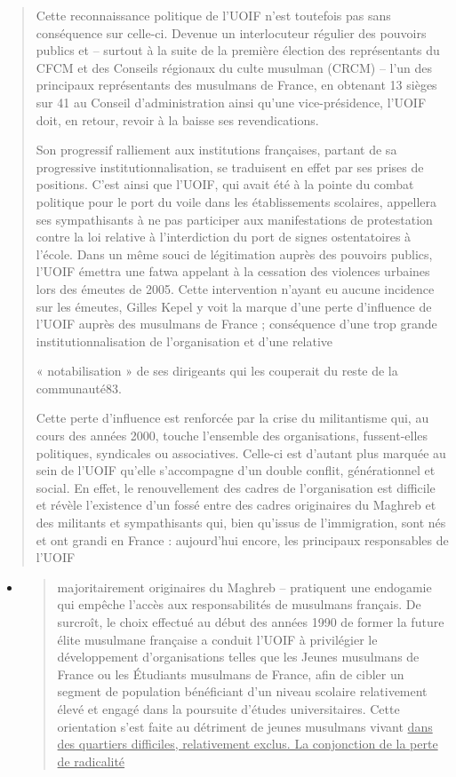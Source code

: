 \begin{quote}
Cette reconnaissance politique de l'UOIF n'est toutefois pas sans
conséquence sur celle-ci. Devenue un interlocuteur régulier des pouvoirs
publics et -- surtout à la suite de la première élection des
représentants du CFCM et des Conseils régionaux du culte musulman (CRCM)
-- l'un des principaux représentants des musulmans de France, en
obtenant 13 sièges sur 41 au Conseil d'administration ainsi qu'une
vice-présidence, l'UOIF doit, en retour, revoir à la baisse ses
revendications.

Son progressif ralliement aux institutions françaises, partant de sa
progressive institutionnalisation, se traduisent en effet par ses prises
de positions. C'est ainsi que l'UOIF, qui avait été à la pointe du
combat politique pour le port du voile dans les établissements
scolaires, appellera ses sympathisants à ne pas participer aux
manifestations de protestation contre la loi relative à l'interdiction
du port de signes ostentatoires à l'école. Dans un même souci de
légitimation auprès des pouvoirs publics, l'UOIF émettra une fatwa
appelant à la cessation des violences urbaines lors des émeutes de 2005.
Cette intervention n'ayant eu aucune incidence sur les émeutes, Gilles
Kepel y voit la marque d'une perte d'influence de l'UOIF auprès des
musulmans de France ; conséquence d'une trop grande
institutionnalisation de l'organisation et d'une relative

« notabilisation » de ses dirigeants qui les couperait du reste de la
communauté83.

Cette perte d'influence est renforcée par la crise du militantisme qui,
au cours des années 2000, touche l'ensemble des organisations,
fussent-elles politiques, syndicales ou associatives. Celle-ci est
d'autant plus marquée au sein de l'UOIF qu'elle s'accompagne d'un double
conflit, générationnel et social. En effet, le renouvellement des cadres
de l'organisation est difficile et révèle l'existence d'un fossé entre
des cadres originaires du Maghreb et des militants et sympathisants qui,
bien qu'issus de l'immigration, sont nés et ont grandi en France :
aujourd'hui encore, les principaux responsables de l'UOIF
\end{quote}

\begin{itemize}
\item
  \begin{quote}
  majoritairement originaires du Maghreb -- pratiquent une endogamie qui
  empêche l'accès aux responsabilités de musulmans français. De
  surcroît, le choix effectué au début des années 1990 de former la
  future élite musulmane française a conduit l'UOIF à privilégier le
  développement d'organisations telles que les Jeunes musulmans de
  France ou les Étudiants musulmans de France, afin de cibler un segment
  de population bénéficiant d'un niveau scolaire relativement élevé et
  engagé dans la poursuite d'études universitaires. Cette orientation
  s'est faite au détriment de jeunes musulmans vivant \underline{dans
  des quartiers difficiles, relativement exclus. La conjonction de la
  perte de radicalité}
  \end{quote}
\end{itemize}

